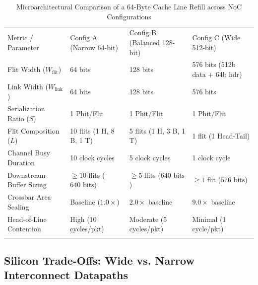 \begin{table}[t]
\caption{Microarchitectural Comparison of a 64-Byte Cache Line Refill across NoC Configurations}
\label{tab:ch2_cache_refill_comparison}
\begin{tabular}{p{2.6cm}p{2.6cm}p{2.8cm}p{2.8cm}}
\hline\noalign{\smallskip}
Metric / Parameter & Config A (Narrow 64-bit) & Config B (Balanced 128-bit) & Config C (Wide 512-bit) \\
\noalign{\smallskip}\svhline\noalign{\smallskip}
Flit Width ($W_{\text{flit}}$) & 64 bits & 128 bits & 576 bits (512b data + 64b hdr) \\
Link Width ($W_{\text{link}}$) & 64 bits & 128 bits & 576 bits \\
Serialization Ratio ($S$) & 1 Phit/Flit & 1 Phit/Flit & 1 Phit/Flit \\
Flit Composition ($L$) & 10 flits (1 H, 8 B, 1 T) & 5 flits (1 H, 3 B, 1 T) & 1 flit (1 Head-Tail) \\
Channel Busy Duration & 10 clock cycles & 5 clock cycles & 1 clock cycle \\
Downstream Buffer Sizing & $\ge 10$ flits ($640\text{ bits}$) & $\ge 5$ flits ($640\text{ bits}$) & $\ge 1$ flit ($576\text{ bits}$) \\
Crossbar Area Scaling & Baseline ($1.0\times$) & $2.0\times$ baseline & $9.0\times$ baseline \\
Head-of-Line Contention & High (10 cycles/pkt) & Moderate (5 cycles/pkt) & Minimal (1 cycle/pkt) \\
\noalign{\smallskip}\hline\noalign{\smallskip}
\end{tabular}
\end{table}

\subsection{Silicon Trade-Offs: Wide vs. Narrow Interconnect Datapaths}
\label{subsec:ch2_wire_tradeoffs}

